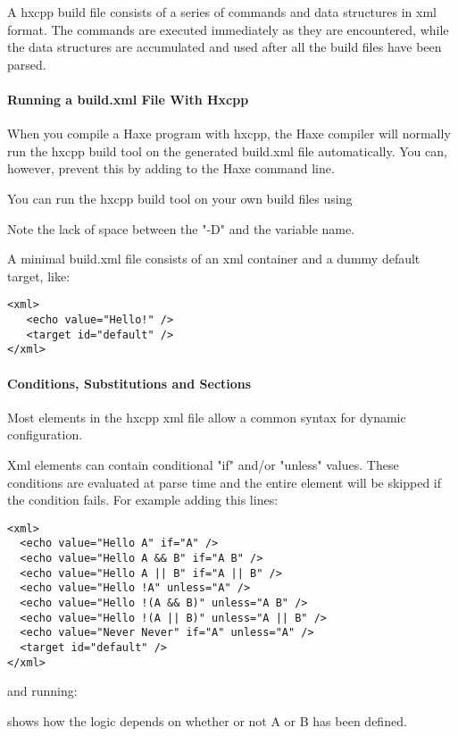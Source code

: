 A hxcpp build file consists of a series of commands and data structures in xml format.  The commands are executed immediately as they are encountered, while the data structures are accumulated and used after all the build files have been parsed.

\paragraph{Running a build.xml File With Hxcpp}
When you compile a Haxe program with hxcpp, the Haxe compiler will normally run the hxcpp build tool on the generated build.xml file automatically.  You can, however, prevent this by adding  to the Haxe command line.

You can run the hxcpp build tool on your own build files using


Note the lack of space between the "-D" and the variable name.

A minimal build.xml file consists of an xml container and a dummy default target, like:
\begin{lstlisting}
<xml>
   <echo value="Hello!" />
   <target id="default" />
</xml>
\end{lstlisting}

\paragraph{Conditions, Substitutions and Sections}
Most elements in the hxcpp xml file allow a common syntax for dynamic configuration.

Xml elements can contain conditional "if" and/or "unless" values.  These conditions are evaluated at parse time and the entire element will be skipped if the condition fails.  For example adding this lines:
\begin{lstlisting}
<xml>
  <echo value="Hello A" if="A" />
  <echo value="Hello A && B" if="A B" />
  <echo value="Hello A || B" if="A || B" />
  <echo value="Hello !A" unless="A" />
  <echo value="Hello !(A && B)" unless="A B" />
  <echo value="Hello !(A || B)" unless="A || B" />
  <echo value="Never Never" if="A" unless="A" />
  <target id="default" />
</xml>
\end{lstlisting}

and running:


shows how the logic depends on whether or not A or B has been defined.

